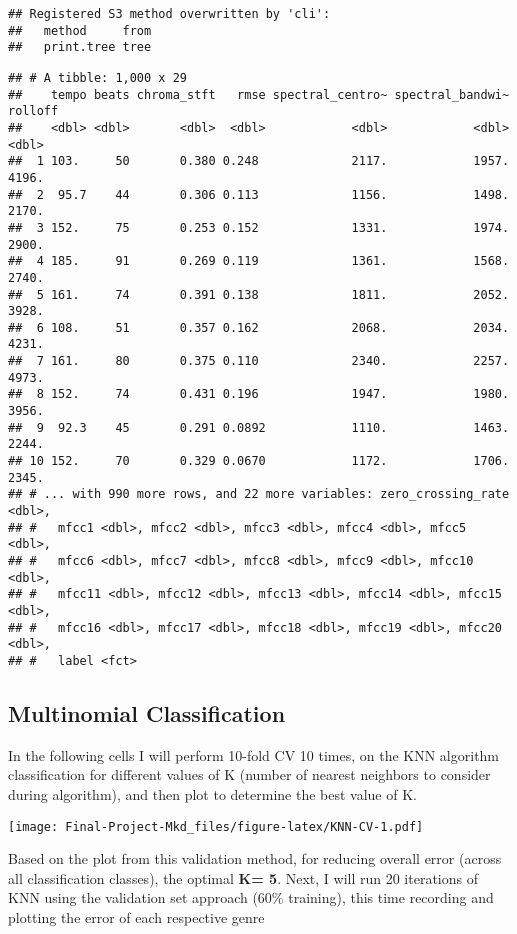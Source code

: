 \documentclass[
]{article}
\begin{document}
\begin{verbatim}
## Registered S3 method overwritten by 'cli':
##   method     from
##   print.tree tree
\end{verbatim}

\begin{verbatim}
## # A tibble: 1,000 x 29
##    tempo beats chroma_stft   rmse spectral_centro~ spectral_bandwi~ rolloff
##    <dbl> <dbl>       <dbl>  <dbl>            <dbl>            <dbl>   <dbl>
##  1 103.     50       0.380 0.248             2117.            1957.   4196.
##  2  95.7    44       0.306 0.113             1156.            1498.   2170.
##  3 152.     75       0.253 0.152             1331.            1974.   2900.
##  4 185.     91       0.269 0.119             1361.            1568.   2740.
##  5 161.     74       0.391 0.138             1811.            2052.   3928.
##  6 108.     51       0.357 0.162             2068.            2034.   4231.
##  7 161.     80       0.375 0.110             2340.            2257.   4973.
##  8 152.     74       0.431 0.196             1947.            1980.   3956.
##  9  92.3    45       0.291 0.0892            1110.            1463.   2244.
## 10 152.     70       0.329 0.0670            1172.            1706.   2345.
## # ... with 990 more rows, and 22 more variables: zero_crossing_rate <dbl>,
## #   mfcc1 <dbl>, mfcc2 <dbl>, mfcc3 <dbl>, mfcc4 <dbl>, mfcc5 <dbl>,
## #   mfcc6 <dbl>, mfcc7 <dbl>, mfcc8 <dbl>, mfcc9 <dbl>, mfcc10 <dbl>,
## #   mfcc11 <dbl>, mfcc12 <dbl>, mfcc13 <dbl>, mfcc14 <dbl>, mfcc15 <dbl>,
## #   mfcc16 <dbl>, mfcc17 <dbl>, mfcc18 <dbl>, mfcc19 <dbl>, mfcc20 <dbl>,
## #   label <fct>
\end{verbatim}

\hypertarget{multinomial-classification}{%
\subsection{\texorpdfstring{\textbf{Multinomial
Classification}}{Multinomial Classification}}\label{multinomial-classification}}

In the following cells I will perform 10-fold CV 10 times, on the KNN
algorithm classification for different values of K (number of nearest
neighbors to consider during algorithm), and then plot to determine the
best value of K.

\texttt{[image: Final-Project-Mkd\_files/figure-latex/KNN-CV-1.pdf]}

Based on the plot from this validation method, for reducing overall
error (across all classification classes), the optimal \textbf{K= 5}.
Next, I will run 20 iterations of KNN using the validation set approach
(60\% training), this time recording and plotting the error of each
respective genre
\end{document}
